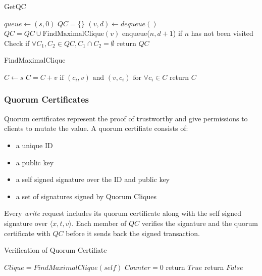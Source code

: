 \documentclass[twoside,twocolumn,10pt,fleqn]{article}
\begin{document}
\begin{algorithm}
  \caption{GetQC}
  \SetAlgoNoLine
  $queue \leftarrow {(s, 0)}$\;
  $QC = \{\}$\;
  {
    $(v, d) \leftarrow dequeue()$\;
    $QC = QC \cup \text{FindMaximalClique}(v)$\;
    {
      enqueue($n, d + 1$) if $n$ has not been visited\;
    }
  }
  Check if $\forall C_1, C_2 \in QC, C_1 \cap C_2 = \emptyset$\;
  return $QC$
\end{algorithm}

\begin{algorithm}
  \caption{FindMaximalClique}
  \SetAlgoNoLine
  $C \leftarrow {s}$\;
  {
    $C = C + {v} \text{ if } (c_i, v) \text{ and } (v, c_i)
    \text{ for } \forall c_i \in C$\;
  }
  return $C$
\end{algorithm}

\subsubsection*{Quorum Certificates}
Quorum certificates represent the proof of trustworthy and give
permissions to clients to mutate the value.
A quorum certifiate consists of:
\begin{itemize}
\item a unique ID
\item a public key
\item a self signed signature over the ID and public key
\item a set of signatures signed by Quorum Cliques
\end{itemize}

Every {\em write} request includes its quorum certificate along with the
self signed signature over $\langle x, t, v \rangle$. Each member of
$QC$ verifies the signature and the quorum certificate with $QC$
before it sends back the signed transaction.

\begin{algorithm}
  \caption{Verification of Quorum Certifiate}
  \SetAlgoNoLine
  $Clique = FindMaximalClique(self)$\;
  $Counter = 0$\;
  {
  }
  {
    return $True$\;
  }{
    return $False$\;
  }
\end{algorithm}
\end{document}
